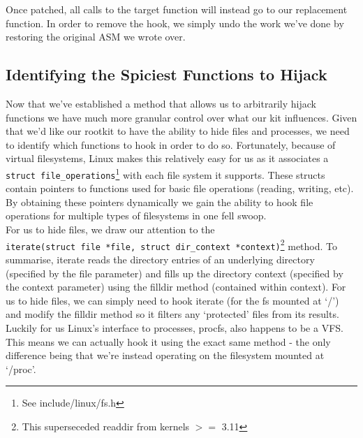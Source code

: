 \documentclass[11pt]{article}
\begin{document}
Once patched, all calls to the target function will instead go to our replacement function. In order to remove the hook, we simply undo the work we've done by restoring the original ASM we wrote over.
\newpage
\subsection{Identifying the Spiciest Functions to Hijack}
Now that we've established a method that allows us to arbitrarily hijack functions we have much more granular control over what our kit influences. Given that we'd like our rootkit to have the ability to hide files and processes, we need to identify which functions to hook in order to do so. Fortunately, because of virtual filesystems, Linux makes this relatively easy for us as it associates a \texttt{struct file_operations}\footnote[2]{See include/linux/fs.h} with each file system it supports. These structs contain pointers to functions used for basic file operations (reading, writing, etc). By obtaining these pointers dynamically we gain the ability to hook file operations for multiple types of filesystems in one fell swoop.\\

For us to hide files, we draw our attention to the\\ \texttt{iterate(struct file *file, struct dir_context *context)}\footnote[3]{This superseceded readdir from kernels $>=$ 3.11} method. To summarise, iterate reads the directory entries of an underlying directory (specified by the file parameter) and fills up the directory context (specified by the context parameter) using the filldir method (contained within context). For us to hide files, we can simply need to hook iterate (for the fs mounted at `/') and modify the filldir method so it filters any `protected' files from its results.\\

Luckily for us Linux's interface to processes, procfs, also happens to be a VFS. This means we can actually hook it using the exact same method - the only difference being that we're instead operating on the filesystem mounted at `/proc'.\\
\end{document}
